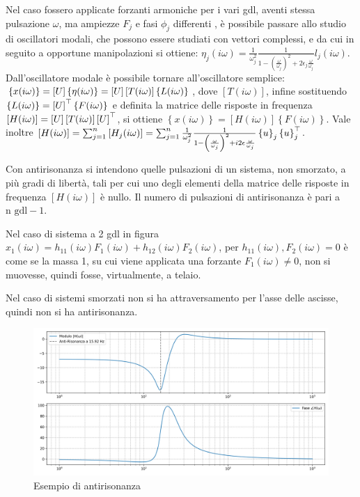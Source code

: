 Nel caso fossero applicate forzanti armoniche per i vari gdl, aventi stessa pulsazione \(\omega\), ma ampiezze \(F_j\) e fasi \(\phi_j\) differenti , è possibile passare allo studio di oscillatori modali, che possono essere studiati con vettori complessi, e da cui in seguito a opportune manipolazioni  si ottiene: \(\eta_j(i\omega) = \frac{1}{\omega_j^2} \frac{1}{1-\left(\frac{\omega}{\omega_j}\right)^2 + 2\epsilon_j \frac{\omega}{\omega_j}} l_j(i\omega)\).
Dall'oscillatore modale è possibile tornare all'oscillatore semplice: \(\left\{ x(i\omega) \right\} = \left[ U \right] \left\{ \eta(i\omega) \right\} = \left[ U \right] \left[ T(i\omega) \right] \left\{ L(i\omega) \right\} \), dove \(\left[ T(i\omega) \right]\), infine sostituendo \(\left\{ L(i\omega) \right\} = \left[ U \right]^\top \left\{ F(i\omega) \right\}\) e definita la matrice delle risposte in frequenza \( \left[ H(i\omega) \right] = \left[ U \right] \left[ T(i\omega) \right] \left[ U \right]^\top \), si ottiene \( \left\{ x(i\omega) \right\} = \left[ H(i\omega) \right] \left\{ F(i\omega) \right\} \).
Vale inoltre \(\left[ H(i\omega) \right] = \sum^n_{j=1} \left[ H_j(i\omega) \right] = \sum^n_{j=1} \frac{1}{\omega^2_j} \frac{1}{1-\left(\frac{\omega}{\omega_j}\right)^2 + i2 \epsilon \frac{\omega}{\omega_j}} \left\{ u \right\}_j \left\{ u \right\}_j^\top \).



Con antirisonanza si intendono quelle pulsazioni di un sistema, non smorzato, a più gradi di libertà, tali per cui uno degli elementi della matrice delle risposte in frequenza \(\left[ H(i\omega) \right]\) è nullo.
Il numero di pulsazioni di antirisonanza è pari a \(\text{n gdl} - 1\).

Nel caso di sistema a 2 gdl in figura  \( x_1(i\omega) = h_{11}(i\omega) F_1(i\omega) + h_{12}(i\omega)F_2(i\omega) \), per \( h_{11}(i\omega), F_2(i\omega) = 0\) è come se la massa 1, su cui viene applicata una forzante \(F_1(i\omega)\neq 0\), non si muovesse, quindi fosse, virtualmente, a telaio.

Nel caso di sistemi smorzati non si ha attraversamento per l'asse delle ascisse, quindi non si ha antirisonanza.

\begin{figure}[h]
    \centering
    \includegraphics[width=0.5\textiwidth]{Immagini/esempio_antirisonanza.png}
    \caption{Esempio di antirisonanza}
\end{figure}



